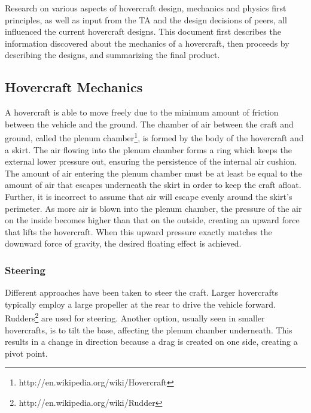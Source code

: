 Research on various aspects of hovercraft design, mechanics and physics first principles, as well as input from the TA and the design decisions of peers, all influenced the current hovercraft designs. This document first describes the information discovered about the mechanics of a hovercraft, then proceeds by describing the designs, and summarizing the final product.

\subsection{Hovercraft Mechanics}
A hovercraft is able to move freely due to the minimum amount of friction between the vehicle and the ground. The chamber of air between the craft and ground, called the plenum chamber\footnote{http://en.wikipedia.org/wiki/Hovercraft}, is formed by the body of the hovercraft and a skirt. The air flowing into the plenum chamber forms a ring which keeps the external lower pressure out, ensuring the persistence of the internal air cushion. The amount of air entering the plenum chamber must be at least be equal to the amount of air that escapes underneath the skirt in order to keep the craft afloat. Further, it is incorrect to assume that air will escape evenly around the skirt’s perimeter. As more air is blown into the plenum chamber, the pressure of the air on the inside becomes higher than that on the outside, creating an upward force that lifts the hovercraft. When this upward pressure exactly matches the downward force of gravity, the desired floating effect is achieved. \cite{CambridgeJournals:370274} \cite{831309}

\subsubsection{Steering}
Different approaches have been taken to steer the craft. Larger hovercrafts typically employ a large propeller at the rear to drive the vehicle forward. Rudders\footnote{http://en.wikipedia.org/wiki/Rudder} are used for steering. Another option, usually seen in smaller hovercrafts, is to tilt the base, affecting the plenum chamber underneath. This results in a change in direction because a drag is created on one side, creating a pivot point.


